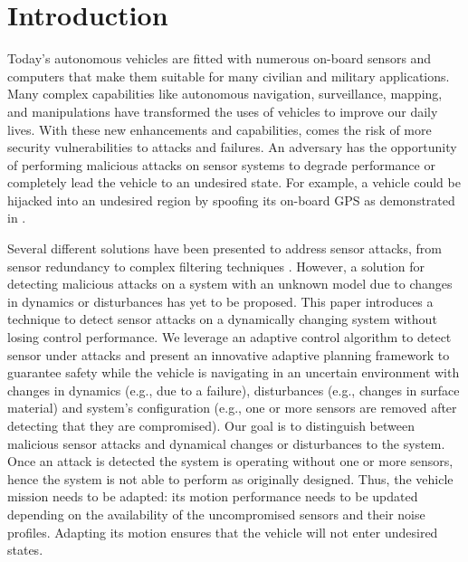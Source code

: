 
\section{Introduction} \label{sec:introduction}

Today's autonomous vehicles are fitted with numerous on-board sensors and computers that make them suitable for many civilian and military applications. Many complex capabilities like autonomous navigation, surveillance, mapping, and manipulations have transformed the uses of vehicles to improve our daily lives. 
With these new enhancements and capabilities, comes the risk of more security vulnerabilities to attacks and failures. An adversary has the opportunity of performing malicious attacks on sensor systems to degrade performance or completely lead the vehicle to an undesired state. For example, a vehicle could be hijacked into an undesired region by spoofing its on-board GPS as demonstrated in \cite{lee}.

Several different solutions have been presented to address sensor attacks, from sensor redundancy to complex filtering techniques \cite{fawzi2014secure,pasqualetti2013attack,6120187,6943080,7330811}. However, a solution for detecting malicious attacks on a system with an unknown model due to changes in dynamics or disturbances has yet to be proposed. This paper introduces a technique to detect sensor attacks on a dynamically changing system without losing control performance. We leverage an adaptive control algorithm to detect sensor under attacks and present an innovative adaptive planning framework to guarantee safety while the vehicle is navigating in an uncertain environment with changes in dynamics (e.g., due to a failure), disturbances (e.g., changes in surface material) and system's configuration (e.g., one or more sensors are removed after detecting that they are compromised). 
Our goal is to distinguish between malicious sensor attacks and dynamical changes or disturbances to the system. Once an attack is detected the system is operating without one or more sensors, hence the system is not able to perform as originally designed. Thus, the vehicle mission needs to be adapted: its motion performance needs  to be updated depending on the availability of the uncompromised sensors and their noise profiles. Adapting its motion ensures that the vehicle will not enter undesired states. 

